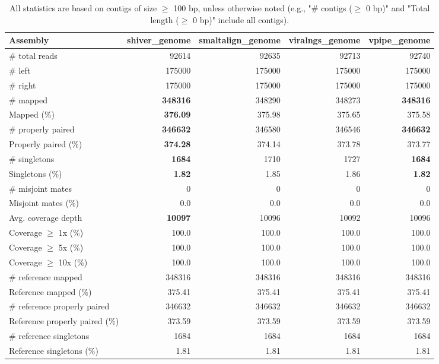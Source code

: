 \documentclass[12pt,a4paper]{article}
\begin{document}
\begin{table}[ht]
\begin{center}
\caption{All statistics are based on contigs of size $\geq$ 100 bp, unless otherwise noted (e.g., "\# contigs ($\geq$ 0 bp)" and "Total length ($\geq$ 0 bp)" include all contigs).}
\begin{tabular}{|l*{4}{|r}|}
\hline
Assembly & shiver\_genome & smaltalign\_genome & viralngs\_genome & vpipe\_genome \\ \hline
\# total reads & 92614 & 92635 & 92713 & 92740 \\ \hline
\# left & 175000 & 175000 & 175000 & 175000 \\ \hline
\# right & 175000 & 175000 & 175000 & 175000 \\ \hline
\# mapped & {\bf 348316} & 348290 & 348273 & {\bf 348316} \\ \hline
Mapped (\%) & {\bf 376.09} & 375.98 & 375.65 & 375.58 \\ \hline
\# properly paired & {\bf 346632} & 346580 & 346546 & {\bf 346632} \\ \hline
Properly paired (\%) & {\bf 374.28} & 374.14 & 373.78 & 373.77 \\ \hline
\# singletons & {\bf 1684} & 1710 & 1727 & {\bf 1684} \\ \hline
Singletons (\%) & {\bf 1.82} & 1.85 & 1.86 & {\bf 1.82} \\ \hline
\# misjoint mates & 0 & 0 & 0 & 0 \\ \hline
Misjoint mates (\%) & 0.0 & 0.0 & 0.0 & 0.0 \\ \hline
Avg. coverage depth & {\bf 10097} & 10096 & 10092 & 10096 \\ \hline
Coverage $\geq$ 1x (\%) & 100.0 & 100.0 & 100.0 & 100.0 \\ \hline
Coverage $\geq$ 5x (\%) & 100.0 & 100.0 & 100.0 & 100.0 \\ \hline
Coverage $\geq$ 10x (\%) & 100.0 & 100.0 & 100.0 & 100.0 \\ \hline
\# reference mapped & 348316 & 348316 & 348316 & 348316 \\ \hline
Reference mapped (\%) & 375.41 & 375.41 & 375.41 & 375.41 \\ \hline
\# reference properly paired & 346632 & 346632 & 346632 & 346632 \\ \hline
Reference properly paired (\%) & 373.59 & 373.59 & 373.59 & 373.59 \\ \hline
\# reference singletons & 1684 & 1684 & 1684 & 1684 \\ \hline
Reference singletons (\%) & 1.81 & 1.81 & 1.81 & 1.81 \\ \hline

\end{tabular}
\end{center}
\end{table}
\end{document}

